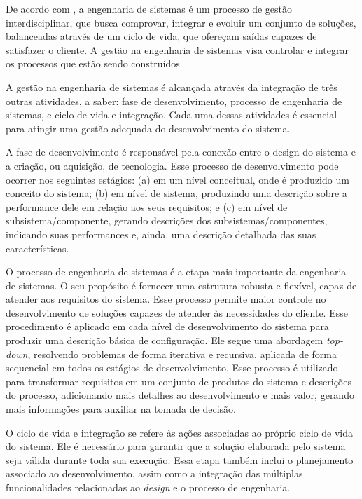     De acordo com , a engenharia de sistemas é um processo de gestão interdisciplinar, que busca comprovar, integrar e evoluir um conjunto de soluções, balanceadas através de um ciclo de vida, que ofereçam saídas capazes de satisfazer o cliente. A gestão na engenharia de sistemas visa controlar e integrar os processos que estão sendo construídos. 
    
        
    A gestão na engenharia de sistemas é alcançada através da integração de três outras atividades, a saber: fase de desenvolvimento, processo de engenharia de sistemas, e ciclo de vida e integração. Cada uma dessas atividades é essencial para atingir uma gestão adequada do desenvolvimento do sistema.
    
    A fase de desenvolvimento é responsável pela conexão entre o design do sistema e a criação, ou aquisição, de tecnologia. Esse processo de desenvolvimento pode ocorrer nos seguintes estágios: (a) em um nível conceitual, onde é produzido um conceito do sistema; (b) em nível de sistema, produzindo uma descrição sobre a performance dele em relação aos seus requisitos; e (c) em nível de subsistema/componente, gerando descrições dos subsistemas/componentes, indicando suas performances e, ainda, uma descrição detalhada das suas características.
    
    O processo de engenharia de sistemas é a etapa mais importante da engenharia de sistemas. O seu propósito é fornecer uma estrutura robusta e flexível, capaz de atender aos requisitos do sistema. Esse processo permite maior controle no desenvolvimento de soluções capazes de atender às necessidades do cliente. Esse procedimento é aplicado em cada nível de desenvolvimento do sistema para produzir uma descrição básica de configuração. Ele segue uma abordagem \textit{top-down}, resolvendo problemas de forma iterativa e recursiva, aplicada de forma sequencial em todos os estágios de desenvolvimento. Esse processo é utilizado para transformar requisitos em um conjunto de produtos do sistema e descrições do processo, adicionando mais detalhes ao desenvolvimento e mais valor, gerando mais informações para auxiliar na tomada de decisão.

    O ciclo de vida e integração se refere às ações associadas ao próprio ciclo de vida do sistema. Ele é necessário para garantir que a solução elaborada pelo sistema seja válida durante toda sua execução. Essa etapa também inclui o planejamento associado ao desenvolvimento, assim como a integração das múltiplas funcionalidades relacionadas ao \textit{design} e o processo de engenharia.


